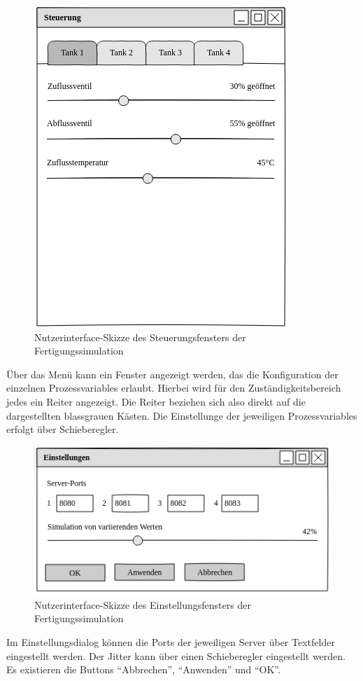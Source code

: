 \documentclass[parskip=full]{scrartcl}
\begin{document}
\begin{figure}[H]
  \centering
  \includegraphics[scale=0.5]{media/ui-server/ui-server-control.png}
  \caption{Nutzerinterface-Skizze des Steuerungsfensters der Fertigungssimulation}
\end{figure}
Über das Menü kann ein Fenster angezeigt werden, das die Konfiguration der einzelnen \glspl{Prozessvariable} erlaubt. Hierbei
wird für den Zuständigkeitsbereich jedes  ein Reiter angezeigt. Die Reiter beziehen sich also
direkt auf die dargestellten blassgrauen Kästen. Die Einstellunge der jeweiligen \glspl{Prozessvariable} erfolgt über Schieberegler.

\begin{figure}[H]
  \centering
  \includegraphics[scale=0.5]{media/ui-server/ui-server-settings.png}
  \caption{Nutzerinterface-Skizze des Einstellungsfensters der Fertigungssimulation}
\end{figure}
Im Einstellungsdialog können die Ports der jeweiligen Server über Textfelder eingestellt werden. Der Jitter kann über einen Schieberegler
eingestellt werden. Es existieren die Buttons "`Abbrechen"', "`Anwenden"' und "`OK"'. 
\end{document}
